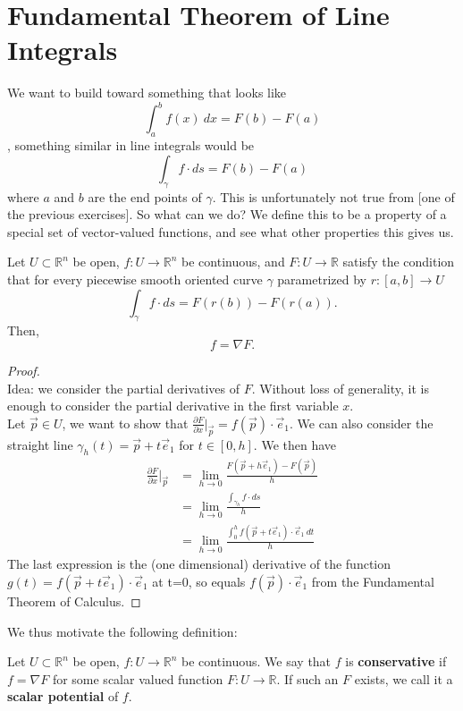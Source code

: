 \documentclass[11pt,openany]{book}
\newcommand{\definition}[2]{\begin{tcolorbox}[title=Definition ({#1}),colframe=black]{#2}\end{tcolorbox}
}
\newcommand{\proposition}[1]{\begin{tcolorbox}[title=Proposition,colframe=red!50!blue!20!white,colback=red!35!blue!10!white, coltitle=black]{#1}\end{tcolorbox}
}
\begin{document}
	\section*{Fundamental Theorem of Line Integrals}
	We want to build toward something that looks like 
	\[
		\int_{a}^{b} f(x) \ dx = F(b) - F(a)
	\], something similar in line integrals would be \[
		\int_\gamma f \cdot ds = F(b) - F(a)
	\] where $a$ and $b$ are the end points of $\gamma$. This is unfortunately not true from [one of the previous exercises]. So what can we do? We define this to be a property of a special set of vector-valued functions, and see what other properties this gives us.
	
	
	\proposition{
		Let $U\subset\mathbb{R}^n$ be open, $f:U\to\mathbb{R}^n$ be continuous, and $F:U\to\mathbb{R}$ satisfy the condition that for every piecewise smooth oriented curve $\gamma$ parametrized by $r: [a,b]\to U$
		\[
		\int_\gamma f \cdot ds = F(r(b)) - F(r(a)).
		\] 
		Then, \[
			f = \nabla F.
		\]
	}
	\begin{proof} \ \\
		Idea: we consider the partial derivatives of $F$. Without loss of generality, it is enough to consider the partial derivative in the first variable $x$. \\
		Let $\vec{p} \in U$, we want to show that $\frac{\partial F}{\partial x} \big| _{\vec{p}} = f(\vec{p}) \cdot \vec{e}_1$. We can also consider the straight line $\gamma_h(t) = \vec{p} + t\vec{e}_1$ for $t\in[0,h]$. We then have \begin{align*}
			\frac{\partial F}{\partial x} \big| _{\vec{p}} &= \lim_{h\to 0} \frac{F(\vec{p}+h\vec{e}_1)-F(\vec{p})}{h} \\
			&= \lim_{h\to 0} \frac{\int_{\gamma_h} f \cdot ds}{h}\\
			&= \lim_{h\to 0} \frac{\int_0^h f(\vec{p}+t\vec{e}_1) \cdot \vec{e}_1 \ dt}{h}
		\end{align*}
		The last expression is the (one dimensional) derivative of the function $g(t)=f(\vec{p}+t\vec{e}_1) \cdot \vec{e}_1$ at t=0, so equals $f(\vec{p})\cdot \vec{e}_1$ from the Fundamental Theorem of Calculus.
	\end{proof}
	
	We thus motivate the following definition:
	\definition{Conservative Vector Fields}{
		Let $U\subset\mathbb{R}^n$ be open, $f:U\to\mathbb{R}^n$ be continuous. We say that $f$ is \textbf{conservative} if
		$f = \nabla F $ for some scalar valued function $F:U\to\mathbb{R}$.
		If such an $F$ exists, we call it a \textbf{scalar potential} of $f$.
	}
 
\end{document}
